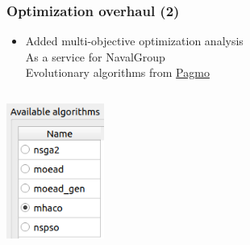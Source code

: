 \documentclass[aspectratio=169]{beamer}
\begin{document}
\begin{frame}
  \frametitle{Optimization overhaul (2)}

  \begin{itemize}
  \item Added multi-objective optimization analysis \\
    As a service for NavalGroup \\
    Evolutionary algorithms from \url{Pagmo}
  \end{itemize}

  \begin{columns}

    \begin{center}
      \includegraphics[width=0.8\textwidth]{figures/moAlgos.png}
    \end{center}


\end{columns}
\end{frame}
\end{document}
